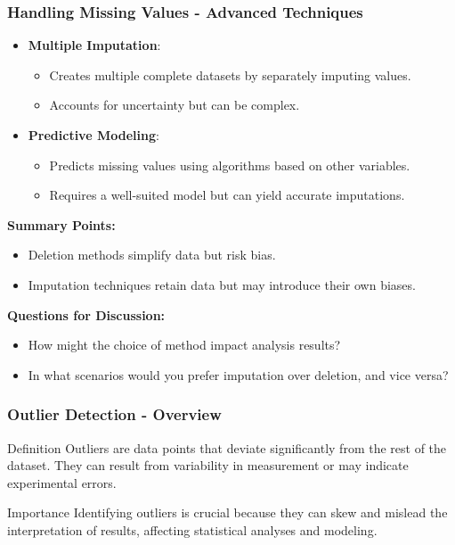\documentclass[aspectratio=169]{beamer}
\begin{document}
\begin{frame}[fragile]
    \frametitle{Handling Missing Values - Advanced Techniques}
    \begin{itemize}
        \item \textbf{Multiple Imputation}:
        \begin{itemize}
            \item Creates multiple complete datasets by separately imputing values.
            \item Accounts for uncertainty but can be complex.
        \end{itemize}
        \item \textbf{Predictive Modeling}:
        \begin{itemize}
            \item Predicts missing values using algorithms based on other variables.
            \item Requires a well-suited model but can yield accurate imputations.
        \end{itemize}
    \end{itemize}
    
    \textbf{Summary Points:}
    \begin{itemize}
        \item Deletion methods simplify data but risk bias.
        \item Imputation techniques retain data but may introduce their own biases.
    \end{itemize}

    \textbf{Questions for Discussion:}
    \begin{itemize}
        \item How might the choice of method impact analysis results?
        \item In what scenarios would you prefer imputation over deletion, and vice versa?
    \end{itemize}
\end{frame}

\begin{frame}[fragile]
    \frametitle{Outlier Detection - Overview}
    \begin{block}{Definition}
        Outliers are data points that deviate significantly from the rest of the dataset. They can result from variability in measurement or may indicate experimental errors.
    \end{block}
    
    \begin{block}{Importance}
        Identifying outliers is crucial because they can skew and mislead the interpretation of results, affecting statistical analyses and modeling.
    \end{block}
\end{frame}
\end{document}
